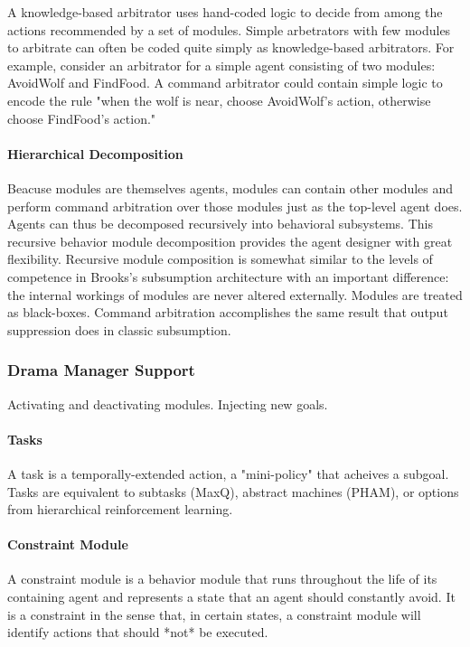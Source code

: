 A knowledge-based arbitrator uses hand-coded logic to decide from
among the actions recommended by a set of modules.  Simple arbetrators
with few modules to arbitrate can often be coded quite simply as
knowledge-based arbitrators.  For example, consider an arbitrator for
a simple agent consisting of two modules: AvoidWolf and FindFood.  A
command arbitrator could contain simple logic to encode the rule "when
the wolf is near, choose AvoidWolf's action, otherwise choose
FindFood's action."

\paragraph{Hierarchical Decomposition}

Beacuse modules are themselves agents, modules can contain other
modules and perform command arbitration over those modules just as the
top-level agent does.  Agents can thus be decomposed recursively into
behavioral subsystems.  This recursive behavior module decomposition
provides the agent designer with great flexibility.  Recursive module
composition is somewhat similar to the levels of competence in
Brooks's subsumption architecture with an important difference: the
internal workings of modules are never altered externally.  Modules
are treated as black-boxes.  Command arbitration accomplishes the same
result that output suppression does in classic subsumption.

\subsubsection{Drama Manager Support}

Activating and deactivating modules. Injecting new goals.

\paragraph{Tasks}

A task is a temporally-extended action, a "mini-policy" that acheives a subgoal.  Tasks are equivalent to subtasks (MaxQ), abstract machines (PHAM), or options from hierarchical reinforcement learning.

\paragraph{Constraint Module}

A constraint module is a behavior module that runs throughout the life of its containing agent and represents a state that an agent should constantly avoid.  It is a constraint in the sense that, in certain states, a constraint module will identify actions that should *not* be executed.

